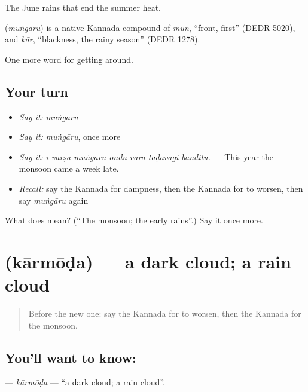 The June rains that end the summer heat.

\begin{cousinweb}
\textbf{} (\emph{muṅgāru}) is a native Kannada compound of \emph{mun}, \textquotedblleft{}front, first\textquotedblright{} (DEDR 5020), and \emph{kār}, \textquotedblleft{}blackness, the rainy season\textquotedblright{} (DEDR 1278).
\end{cousinweb}

\begin{grammarlens}[title={What you've built}]
One more word for getting around.
\end{grammarlens}

\subsection*{Your turn}
\begin{itemize}
\raggedright
  \item \emph{Say it:} \emph{muṅgāru}
  \item \emph{Say it:} \emph{muṅgāru}, once more
  \item \emph{Say it:} \emph{ī varṣa muṅgāru ondu vāra taḍavāgi banditu.} — This year the monsoon came a week late.
  \item \emph{Recall:} say the Kannada for dampness, then the Kannada for to worsen, then say \emph{muṅgāru} again
\end{itemize}

\begin{tcolorbox}[breakable,colback=teal!4,colframe=teal!35!black,title={Before you move on}]
What does  mean? (\textquotedblleft{}The monsoon; the early rains\textquotedblright{}.) Say it once more.
\end{tcolorbox}
\section[\texorpdfstring{\kn{ಕಾರ್ಮೋಡ} (kārmōḍa)}{ಕಾರ್ಮೋಡ (kārmōḍa)}]{ (kārmōḍa) — a dark cloud; a rain cloud}

\label{lesson:KA-C485-karmoda}



\begin{quote}
Before the new one: say the Kannada for to worsen, then the Kannada for the monsoon.
\end{quote}

\subsection*{You'll want to know: }
\textbf{} — \emph{kārmōḍa} — \textquotedblleft{}a dark cloud; a rain cloud\textquotedblright{}.

